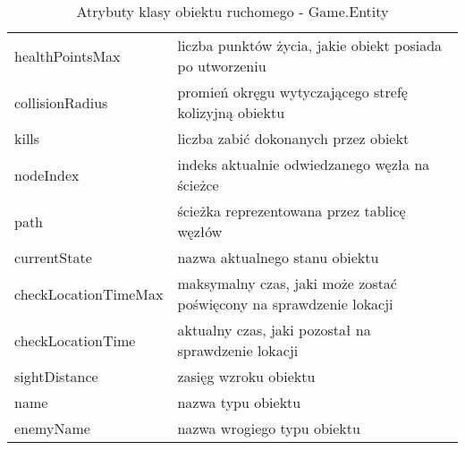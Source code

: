 \begin{table}[p]
\begin{center}
\begin{tabular}{|p{}|p{}|}
    healthPointsMax & liczba punktów życia, jakie obiekt posiada po utworzeniu\\
    collisionRadius & promień okręgu wytyczającego strefę kolizyjną obiektu\\
    kills & liczba zabić dokonanych przez obiekt\\
    nodeIndex & indeks aktualnie odwiedzanego węzła na ścieżce\\
    path & ścieżka reprezentowana przez tablicę węzłów\\
    currentState & nazwa aktualnego stanu obiektu\\
    checkLocationTimeMax & maksymalny czas, jaki może zostać poświęcony na sprawdzenie lokacji\\
    checkLocationTime & aktualny czas, jaki pozostał na sprawdzenie lokacji\\
    sightDistance & zasięg wzroku obiektu\\
    name & nazwa typu obiektu\\
    enemyName & nazwa wrogiego typu obiektu
\\\hline
\end{tabular}
\caption {Atrybuty klasy obiektu ruchomego - Game.Entity\label{objectsGameEntityAttrs}}
\end{center}
\end{table} 

